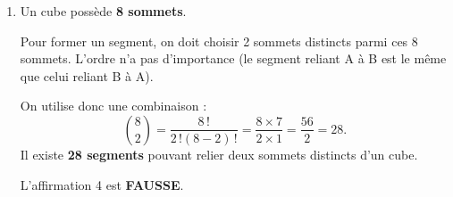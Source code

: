 \begin{enumerate}
\smallskip
	
L'affirmation 3 est \textbf{FAUSSE}.
	\item Un cube possède \textbf{8 sommets}.
	
	Pour former un segment, on doit choisir 2 sommets distincts parmi ces 8 sommets. L'ordre n'a pas d'importance (le segment reliant A à B est le même que celui reliant B à A).
	
	On utilise donc une combinaison :
	\[\binom{8}{2} = \dfrac{8\,!}{2\,!(8-2)\,!} = \dfrac{8 \times 7}{2 \times 1} = \dfrac{56}{2} = 28.\]
	Il existe \textbf{28 segments} pouvant relier deux sommets distincts d'un cube.

	\smallskip
	
	L'affirmation 4 est \textbf{FAUSSE}.
\end{enumerate}


\bigskip
